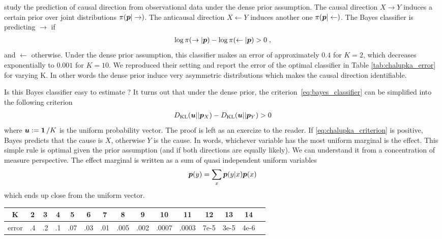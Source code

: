 \begin{subappendices}
\citet{chalupka2016estimating} study the prediction of causal direction from observational data under the dense prior assumption. 
The causal direction $X \rightarrow Y$ induces a certain prior over joint distributions $\pi({\bm{p}} | \rightarrow)$.  
The anticausal direction $X \leftarrow Y$ induces another one $\pi({\bm{p}} | \leftarrow)$.
The Bayes classifier is predicting $\rightarrow$ if 
\begin{align}
    \label{eq:bayes_classifier}
    \log\pi( \rightarrow | {\bm{p}}) -  \log\pi( \leftarrow | {\bm{p}}) > 0 \; ,
\end{align}
and $\leftarrow$ otherwise.
Under the dense prior assumption, this classifier makes an error of approximately $0.4$ for $K=2$, which decreases exponentially to $0.001$ for $K=10$.
We reproduced their setting and report the error of the optimal classifier in Table \ref{tab:chalupka_error} for varying K.
In other words the dense prior induce very asymmetric distributions which makes the causal direction identifiable. 

Is this Bayes classifier easy to estimate ? 
It turns out that under the dense prior, the criterion~\eqref{eq:bayes_classifier} can be simplified into the following criterion   
\begin{align}
    \label{eq:chalupka_criterion}
    D_{\mathrm{KL}}({\bm{u}} || \bm{p}_X) - D_{\mathrm{KL}}({\bm{u}} || \bm{p}_Y) > 0
\end{align}
where ${\bm{u}} := \operatorname{\mathbf{1}} / K$ is the uniform probability vector.
The proof is left as an exercize to the reader. 
If \eqref{eq:chalupka_criterion} is positive, Bayes predicts that the cause is $X$, otherwise $Y$ is the cause.
In words, whichever variable has the most uniform marginal is the effect.
This simple rule is optimal given the prior assumption (and if both directions are equally likely).
We can understand it from a concentration of measure perspective.
The effect marginal is written as a sum of quasi independent uniform variables
\begin{equation}
    \bm{p}(y) = \sum_x \bm{p}(y|x) \bm{p}(x)
\end{equation}
which ends up close from the uniform vector.

\begin{table*}[]
    \small
    \centering
    \begin{tabular}{c|cccccccccccccc}
        K & 2 & 3 & 4 & 5 & 6 & 7 & 8 & 9 & 10 & 11 & 12 & 13 & 14 \\
        \toprule
        error & .4 & .2 & .1 & .07 & .03 & .01 & .005 & .002 & .0007 & .0003 & 7e-5 & 3e-5 & 4e-6 
    \end{tabular}
    \caption[Estimation of the Bayes error under the dense prior assumption]{Estimation of the Bayes error under the dense prior assumption for increasing categorical variables dimension K. 
    We estimated these numbers by sampling one million joint distributions for each K. We report 1 significant figure.}
    \label{tab:chalupka_error}
\end{table*}



\end{subappendices}
